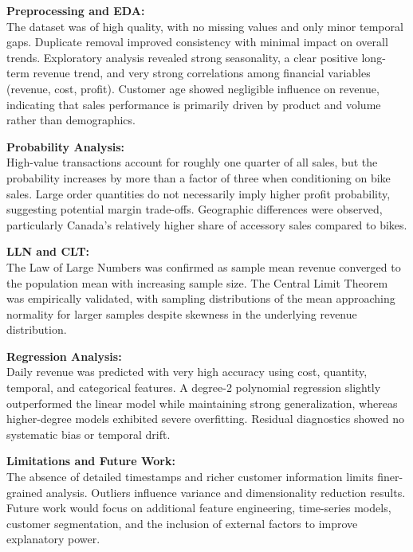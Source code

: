 \documentclass[11pt]{article}
\begin{document}
\noindent\textbf{Preprocessing and EDA:}\\
The dataset was of high quality, with no missing values and only minor temporal gaps. Duplicate removal improved consistency with minimal impact on overall trends. Exploratory analysis revealed strong seasonality, a clear positive long-term revenue trend, and very strong correlations among financial variables (revenue, cost, profit). Customer age showed negligible influence on revenue, indicating that sales performance is primarily driven by product and volume rather than demographics.

\vspace{1em}
\noindent\textbf{Probability Analysis:}\\
High-value transactions account for roughly one quarter of all sales, but the probability increases by more than a factor of three when conditioning on bike sales. Large order quantities do not necessarily imply higher profit probability, suggesting potential margin trade-offs. Geographic differences were observed, particularly Canada’s relatively higher share of accessory sales compared to bikes.

\vspace{1em}
\noindent\textbf{LLN and CLT:}\\
The Law of Large Numbers was confirmed as sample mean revenue converged to the population mean with increasing sample size. The Central Limit Theorem was empirically validated, with sampling distributions of the mean approaching normality for larger samples despite skewness in the underlying revenue distribution.

\vspace{1em}
\noindent\textbf{Regression Analysis:}\\
Daily revenue was predicted with very high accuracy using cost, quantity, temporal, and categorical features. A degree-2 polynomial regression slightly outperformed the linear model while maintaining strong generalization, whereas higher-degree models exhibited severe overfitting. Residual diagnostics showed no systematic bias or temporal drift.

\vspace{1em}
\noindent\textbf{Limitations and Future Work:}\\
The absence of detailed timestamps and richer customer information limits finer-grained analysis. Outliers influence variance and dimensionality reduction results. Future work would focus on additional feature engineering, time-series models, customer segmentation, and the inclusion of external factors to improve explanatory power.
\end{document}
